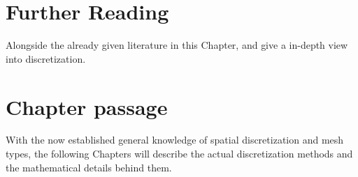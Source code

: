 \section{Further Reading}
Alongside the already given literature in this Chapter, \citep{Wohlmuth2001} and \citep{Hirsch2007} give a in-depth view into discretization.

\section{Chapter passage}
With the now established general knowledge of spatial discretization and mesh types, the following Chapters
will describe the actual discretization methods and the mathematical details behind them.
